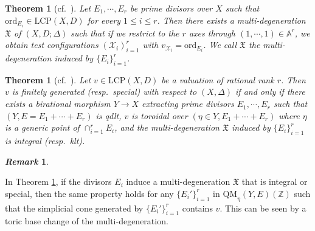 \documentclass[reqno, 12pt]{amsart}
\newtheorem{thm}[prop]{Theorem}
\theoremstyle{definition}
\newtheorem{rem}[prop]{\it Remark}
\newcommand{\bA}{\mathbb{A}}
\newcommand{\bZ}{\mathbb{Z}}
\newcommand{\cX}{\mathcal{X}}
\newcommand{\ord}{\mathrm{ord}}
\newcommand{\wt}{\mathrm{wt}}
\newcommand{\QM}{\mathrm{QM}}
\newcommand{\fX}{\mathfrak{X}}
\newcommand{\LCP}{\mathrm{LCP}}
\numberwithin{equation}{section}
\newcommand{\YL}[1]{{\textcolor{blue}{[Yuchen: #1]}}}
\begin{document}
\begin{thm}[cf.\ {\cite[Theorem 1.3]{Xu21}}]\label{thm:multideg}
Let $E_1,\cdots, E_r$ be prime divisors over $X$ such that $\ord_{E_i}\in \LCP(X,D)$ for every $1\leq i\leq r$. Then there exists a multi-degeneration $\fX$ of $(X,D;\Delta)$ such that if we restrict to the $r$ axes through $(1,\cdots, 1)\in \bA^r$, we obtain    test configurations $(\cX_i)_{i=1}^r$ with $v_{\cX_i} = \ord_{E_i}$. We call $\fX$ the \emph{multi-degeneration induced by} $\{E_i\}_{i=1}^r$.
\end{thm}

\begin{thm}[cf.\ {\cite[Theorem 1.4]{Xu21}}]\label{thm:fg-multideg}
Let $v\in \LCP(X,D)$ be a valuation of rational rank $r$. Then $v$ is finitely generated (resp.\ special) with respect to $(X,\Delta)$ if and only if there exists a birational morphism $Y\to X$ extracting prime divisors $E_1,\cdots, E_r$ such that $(Y, E=E_1+\cdots+E_r)$ is qdlt,  $v$ is toroidal over $(\eta\in Y,  E_1+\cdots+E_r)$ where $\eta$ is a generic point of $\cap_{i=1}^r E_i$, and the multi-degeneration $\fX$ induced by $\{E_i\}_{i=1}^r$ is integral (resp.\ klt). 
\end{thm}




\begin{rem}\label{rem:fg-multideg}
    
    In Theorem \ref{thm:fg-multideg}, if the divisors $E_i$ induce a multi-degeneration $\fX$ that is integral or special, then the same property holds for any $\{E_i'\}_{i=1}^r$ in $\QM_\eta(Y, E)(\bZ)$ such that the simplicial cone generated by $\{E_i'\}_{i=1}^r$ contains $v$. This can be seen by a toric base change of the multi-degeneration.
\end{rem}
\end{document}
